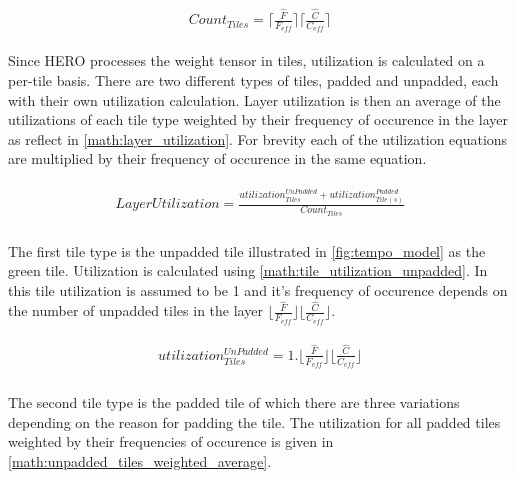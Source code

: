 \begin{align}
    \begin{gathered}
        Count_{Tiles} = \lceil \frac{\hat{F}}{F_{eff}} \rceil \lceil \frac{\hat{C}}{C_{eff}} \rceil
        \end{gathered}
    \label{math:total_tiles}
\end{align}

Since HERO processes the weight tensor in tiles, utilization is calculated on a
per-tile basis. There are two different types of tiles, padded and unpadded,
each with their own utilization calculation. Layer utilization is then an
average of the utilizations of each tile type weighted by their frequency of
occurence in the layer as reflect in \autoref{math:layer_utilization}. For
brevity each of the utilization equations are multiplied by their frequency of
occurence in the same equation. 

\begin{align}
    \begin{gathered}
        LayerUtilization = \frac{utilization^{UnPadded}_{Tiles} + utilization^{Padded}_{Tile(s)}}{Count_{Tiles}} \\
            \end{gathered}
    \label{math:layer_utilization}
\end{align}

The first tile type is the unpadded tile illustrated in
\autoref{fig:tempo_model} as the green tile. Utilization is calculated using
\autoref{math:tile_utilization_unpadded}. In this tile utilization is assumed to
be 1 and it's frequency of occurence depends on the number of unpadded tiles in
the layer $\lfloor \frac{\hat{F}}{F_{eff}} \rfloor \lfloor
\frac{\hat{C}}{C_{eff}}\rfloor$. 

\begin{align}
    \begin{gathered}
        utilization^{UnPadded}_{Tiles} = 1.\lfloor \frac{\hat{F}}{F_{eff}} \rfloor \lfloor \frac{\hat{C}}{C_{eff}}\rfloor \\
            \end{gathered}
    \label{math:tile_utilization_unpadded}
\end{align}

The second tile type is the padded tile of which there are three variations
depending on the reason for padding the tile. The utilization for all
padded tiles weighted by their frequencies of occurence is given in
\autoref{math:unpadded_tiles_weighted_average}. 

